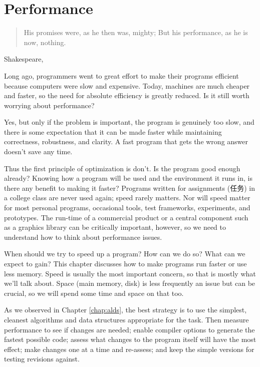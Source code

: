 \chapter{Performance}
\label{chap:performance}
\begin{quote}
    His promises were, as he then was, mighty; But his performance, as he
    is now, nothing.
\end{quote}
\begin{quotesrc}
    Shakespeare, 
\end{quotesrc}

Long ago, programmers went to great effort to make their programs efficient
because computers were slow and expensive. Today, machines are much cheaper
and faster, so the need for absolute efficiency is greatly reduced. Is it
still worth worrying about performance?

Yes, but only if the problem is important, the program is genuinely too
slow, and there is some expectation that it can be made faster while
maintaining correctness, robustness, and clarity. A fast program that gets
the wrong answer doesn't save any time.

Thus the first principle of optimization is don't. Is the program good
enough already? Knowing how a program will be used and the environment it
runs in, is there any benefit to making it faster? Programs written for
assignments (任务)
in a college class are never used again; speed rarely matters.
Nor will speed matter for most personal programs, occasional tools, test
frameworks, experiments, and prototypes. The run-time of a commercial
product or a central component such as a graphics library can be critically
important, however, so we need to understand how to think about performance
issues.

When should we try to speed up a program? How can we do so? What can we
expect to gain? This chapter discusses how to make programs run faster or
use less memory. Speed is usually the most important concern, so that is
mostly what we'll talk about. Space (main memory, disk) is less frequently
an issue but can be crucial, so we will spend some time and space on that
too.

As we observed in Chapter \ref{chap:alds}, the best strategy is to use the
simplest, cleanest algorithms and data structures appropriate for the task.
Then measure performance to see if changes are needed; enable compiler
options to generate the fastest possible code; assess what changes to the
program itself will have the most effect; make changes one at a time and
re-assess; and keep the simple versions for testing revisions against.

